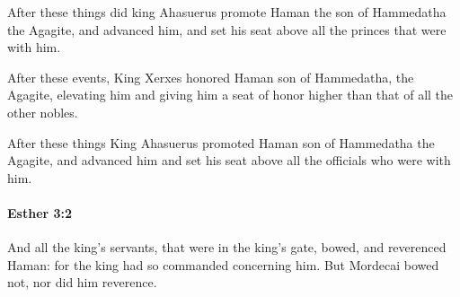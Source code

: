			\begin{versebox}
					\item[BHS] 
					\item[LXX] 
					\item[ASV] After these things did king Ahasuerus promote Haman the son of Hammedatha the Agagite, and advanced him, and set his seat above all the princes that were with him.
					\item[NIV] After these events, King Xerxes honored Haman son of Hammedatha, the Agagite, elevating him and giving him a seat of honor higher than that of all the other nobles.
					\item[NRSV] After these things King Ahasuerus promoted Haman son of Hammedatha the Agagite, and advanced him and set his seat above all the officials who were with him.
			\end{versebox}

		\paragraph{Esther 3:2} %
			\label{ESTHER-3-2}

			And all the king’s servants, that were in the king’s gate, bowed, and reverenced Haman: for the king had so commanded concerning him. But Mordecai bowed not, nor did him reverence.

